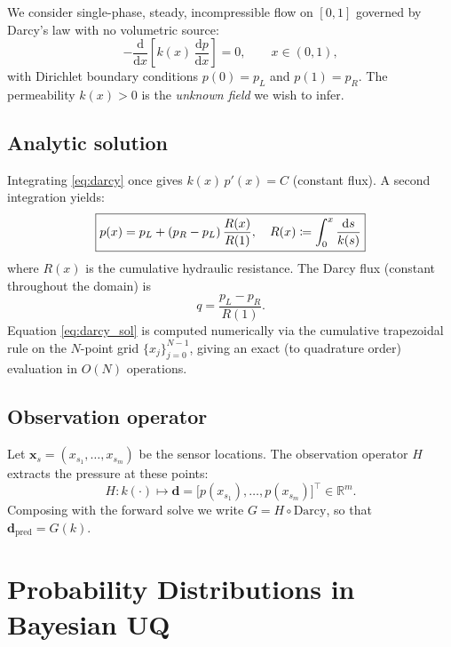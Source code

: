 \documentclass[11pt, a4paper]{article}
\newcommand{\R}{\mathbb{R}}
\theoremstyle{definition}
\begin{document}
We consider single-phase, steady, incompressible flow on $[0,1]$ governed by
Darcy's law with no volumetric source:
\begin{equation}
  -\frac{\mathrm{d}}{\mathrm{d}x}\!\left[k(x)\,\frac{\mathrm{d}p}{\mathrm{d}x}\right] = 0,
  \qquad x\in(0,1),
  \label{eq:darcy}
\end{equation}
with Dirichlet boundary conditions $p(0)=p_L$ and $p(1)=p_R$.  The
permeability $k(x)>0$ is the \emph{unknown field} we wish to infer.

\subsection{Analytic solution}

Integrating \eqref{eq:darcy} once gives $k(x)\,p'(x)=C$ (constant flux).
A second integration yields:
\begin{equation}
  \boxed{%
  p(x) = p_L + (p_R - p_L)\,\frac{R(x)}{R(1)},
  \quad
  R(x) \coloneqq \int_0^x \frac{\mathrm{d}s}{k(s)}}
  \label{eq:darcy_sol}
\end{equation}
where $R(x)$ is the cumulative hydraulic resistance.  The Darcy flux
(constant throughout the domain) is
\begin{equation}
  q = \frac{p_L - p_R}{R(1)}.
\end{equation}
Equation \eqref{eq:darcy_sol} is computed numerically via the
cumulative trapezoidal rule on the $N$-point grid
$\{x_j\}_{j=0}^{N-1}$, giving an exact (to quadrature order) evaluation
in $O(N)$ operations.

\subsection{Observation operator}

Let $\mathbf{x}_s = (x_{s_1},\ldots,x_{s_m})$ be the sensor locations.
The observation operator $H$ extracts the pressure at these points:
\begin{equation}
  H : k(\cdot) \mapsto \mathbf{d} = \bigl[p(x_{s_1}),\ldots,p(x_{s_m})\bigr]^\top
  \in \R^m.
\end{equation}
Composing with the forward solve we write $G=H\circ\text{Darcy}$, so that
$\mathbf{d}_{\mathrm{pred}} = G(k)$.

\section{Probability Distributions in Bayesian UQ}
\end{document}
